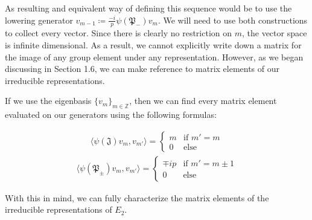 \documentclass[10pt]{ucthesis}
\newcommand{\Z}{\mathbb{Z}}
\begin{document}
As resulting and equivalent way of defining this sequence would be to use the lowering generator $v_{m-1} \coloneq \frac{-i}{p}\psi(\mathfrak{P}_-)v_m$. We will need to use both constructions to collect every vector. Since there is clearly no restriction on $m$, the vector space is infinite dimensional. As a result, we cannot explicitly write down a matrix for the image of any group element under any representation. However, as we began discussing in Section 1.6, we can make reference to matrix elements of our irreducible representations. 

If we use the eigenbasis $\{v_m\}_{m\in\Z}$, then we can find every matrix element evaluated on our generators using the following formulas:

\begin{equation}
\begin{aligned}
	 \langle \psi(\mathfrak{J})v_m , v_{m'} \rangle = \begin{cases}
																m & \text{if }m' = m\\
																0 & \text{else}
															\end{cases}
\end{aligned}
\end{equation}
\begin{equation}
\begin{aligned}
	 \langle \psi(\mathfrak{P}_\pm)v_m , v_{m'} \rangle = \begin{cases}
																\mp ip & \text{if }m' = m \pm 1\\
																0 & \text{else}	
															\end{cases}
\end{aligned}
\end{equation}

With this in mind, we can fully characterize the matrix elements of the irreducible representations of $E_2$.
\end{document}
